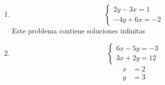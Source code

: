 \documentclass[12pt,letterpaper]{report}
\begin{document}
\begin{enumerate}
\begin{equation*}
\begin{matrix}
             y=-2x+1\\
             4x+2y=3
        \end{matrix} \right.
    \end{equation*}
    Este problema no tiene solución.
    \item\begin{equation*}
        \left\lbrace \begin{matrix}
             2y-3x=1\\
             -4y+6x=-2
        \end{matrix} \right.
    \end{equation*}
    Este problema contiene soluciones infinitas
    \item\begin{equation*}
        \left\lbrace \begin{matrix}
             6x-5y=-3\\
             3x+2y=12
        \end{matrix} \right.
    \end{equation*}
    \begin{align*}
        x&=2\\
        y&=3
    \end{align*}
\end{enumerate}
\end{document}
